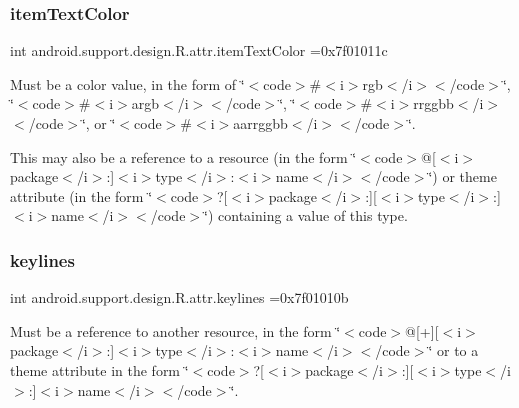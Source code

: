 \subsubsection{\texorpdfstring{item\+Text\+Color}{itemTextColor}}
{\footnotesize\ttfamily int android.\+support.\+design.\+R.\+attr.\+item\+Text\+Color =0x7f01011c\hspace{0.3cm}{\ttfamily [static]}}

Must be a color value, in the form of \char`\"{}$<$code$>$\#$<$i$>$rgb$<$/i$>$$<$/code$>$\char`\"{}, \char`\"{}$<$code$>$\#$<$i$>$argb$<$/i$>$$<$/code$>$\char`\"{}, \char`\"{}$<$code$>$\#$<$i$>$rrggbb$<$/i$>$$<$/code$>$\char`\"{}, or \char`\"{}$<$code$>$\#$<$i$>$aarrggbb$<$/i$>$$<$/code$>$\char`\"{}. 

This may also be a reference to a resource (in the form \char`\"{}$<$code$>$@\mbox{[}$<$i$>$package$<$/i$>$\+:\mbox{]}$<$i$>$type$<$/i$>$\+:$<$i$>$name$<$/i$>$$<$/code$>$\char`\"{}) or theme attribute (in the form \char`\"{}$<$code$>$?\mbox{[}$<$i$>$package$<$/i$>$\+:\mbox{]}\mbox{[}$<$i$>$type$<$/i$>$\+:\mbox{]}$<$i$>$name$<$/i$>$$<$/code$>$\char`\"{}) containing a value of this type. \mbox{\label{classandroid_1_1support_1_1design_1_1R_1_1attr_ad44515d4a3d12b3ce358ed5901dd4590}} 
\subsubsection{\texorpdfstring{keylines}{keylines}}
{\footnotesize\ttfamily int android.\+support.\+design.\+R.\+attr.\+keylines =0x7f01010b\hspace{0.3cm}{\ttfamily [static]}}

Must be a reference to another resource, in the form \char`\"{}$<$code$>$@\mbox{[}+\mbox{]}\mbox{[}$<$i$>$package$<$/i$>$\+:\mbox{]}$<$i$>$type$<$/i$>$\+:$<$i$>$name$<$/i$>$$<$/code$>$\char`\"{} or to a theme attribute in the form \char`\"{}$<$code$>$?\mbox{[}$<$i$>$package$<$/i$>$\+:\mbox{]}\mbox{[}$<$i$>$type$<$/i$>$\+:\mbox{]}$<$i$>$name$<$/i$>$$<$/code$>$\char`\"{}. \mbox{\label{classandroid_1_1support_1_1design_1_1R_1_1attr_a88b4b57756f226e933f01f855538b081}} 
